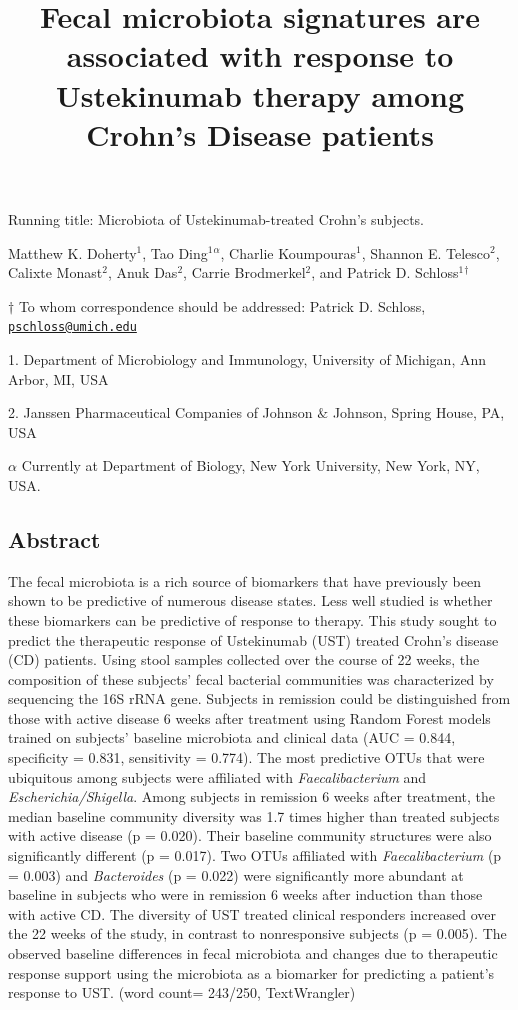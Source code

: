 \documentclass[12pt,]{article}
\title{Fecal microbiota signatures are associated with response to Ustekinumab
therapy among Crohn's Disease patients}
\author{}
\date{}
\begin{document}
\maketitle

\vspace{35mm}

Running title: Microbiota of Ustekinumab-treated Crohn's subjects.

\vspace{35mm} Matthew K. Doherty\({^1}\), Tao Ding\({^1}\)\({^\alpha}\),
Charlie Koumpouras\({^1}\), Shannon E. Telesco\({^2}\), Calixte
Monast\({^2}\), Anuk Das\({^2}\), Carrie Brodmerkel\({^2}\), and Patrick
D. Schloss\({^1}\)\({^\dagger}\)

\(\dagger\) To whom correspondence should be addressed: Patrick D.
Schloss,
\href{mailto:pschloss@umich.edu}{\nolinkurl{pschloss@umich.edu}}

1. Department of Microbiology and Immunology, University of Michigan,
Ann Arbor, MI, USA

2. Janssen Pharmaceutical Companies of Johnson \({\&}\) Johnson, Spring
House, PA, USA

\({\alpha}\) Currently at Department of Biology, New York University,
New York, NY, USA.

\newpage

\subsection{Abstract}\label{abstract}

The fecal microbiota is a rich source of biomarkers that have previously
been shown to be predictive of numerous disease states. Less well
studied is whether these biomarkers can be predictive of response to
therapy. This study sought to predict the therapeutic response of
Ustekinumab (UST) treated Crohn's disease (CD) patients. Using stool
samples collected over the course of 22 weeks, the composition of these
subjects' fecal bacterial communities was characterized by sequencing
the 16S rRNA gene. Subjects in remission could be distinguished from
those with active disease 6 weeks after treatment using Random Forest
models trained on subjects' baseline microbiota and clinical data (AUC =
0.844, specificity = 0.831, sensitivity = 0.774). The most predictive
OTUs that were ubiquitous among subjects were affiliated with
\emph{Faecalibacterium} and \emph{Escherichia/Shigella}. Among subjects
in remission 6 weeks after treatment, the median baseline community
diversity was 1.7 times higher than treated subjects with active disease
(p = 0.020). Their baseline community structures were also significantly
different (p = 0.017). Two OTUs affiliated with \emph{Faecalibacterium}
(p = 0.003) and \emph{Bacteroides} (p = 0.022) were significantly more
abundant at baseline in subjects who were in remission 6 weeks after
induction than those with active CD. The diversity of UST treated
clinical responders increased over the 22 weeks of the study, in
contrast to nonresponsive subjects (p = 0.005). The observed baseline
differences in fecal microbiota and changes due to therapeutic response
support using the microbiota as a biomarker for predicting a patient's
response to UST. (word count= 243/250, TextWrangler)
\end{document}
